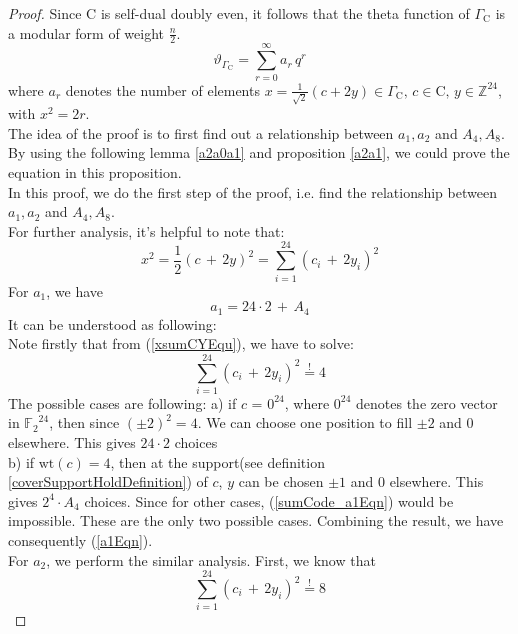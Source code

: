 \documentclass[12pt]{article}
\theoremstyle{definition}
\numberwithin{equation}{theorem}
\numberwithin{figure}{theorem}
\newcommand{\Ftwo}{\ensuremath{\mathbb{F}_2}}
\newcommand{\simpleCodes}{\ensuremath{\mathrm{C}}}
\newcommand{\buildLattice}[1]{\ensuremath{\Gamma_{#1}}}
\newcommand{\thetaFunction}[1]{\ensuremath{\vartheta_{#1}}}
\newcommand{\wt}[1]{\ensuremath{\text{wt}(#1)}}
\newcommand{\Integer}{\ensuremath{\mathbb{Z}}}
\begin{document}
\begin{proof}
Since {\simpleCodes} is self-dual doubly even, it follows that the theta function of $\buildLattice{\simpleCodes}$ is a modular form of weight $\frac{n}{2}$.\\
\[
	\thetaFunction{\buildLattice{\simpleCodes}} = \sum_{r = 0}^{\infty} a_r \, q^r
\]
where $a_r$ denotes the number of elements $x = \frac{1}{\sqrt{2}}(c + 2y) \in \buildLattice{\simpleCodes},\, c \in \simpleCodes, \, y\in \Integer^{24}$, with $x^2 = 2r$. \\
The idea of the proof is to first find out a relationship between $a_1, a_2$ and $A_4, A_8$. By using the following lemma \ref{a2a0a1} and proposition \ref{a2a1}, we could prove the equation in this proposition.\\
In this proof, we do the first step of the proof, i.e. find the relationship between $a_1, a_2$ and $A_4, A_8$.\\
For further analysis, it's helpful to note that:
\begin{equation}\label{xsumCYEqu}
	x^2 = \frac{1}{2}(c \,+\,2y)^2 = \sum_{i = 1}^{24}(c_i \, + \, 2y_i)^2
\end{equation}
For $a_1$, we have
\begin{equation}\label{a1Eqn}
	a_1 = 24 \cdot 2 \,+ \,A_4
\end{equation}
It can be understood as following:\\
Note firstly that from (\ref{xsumCYEqu}), we have to solve:
\begin{equation}\label{sumCode_a1Eqn}
	\sum_{i = 1}^{24}(c_i \, + \, 2y_i)^2 \overset{!}{=} 4
\end{equation}
The possible cases are following:
a) if $c$ = $0^{24}$, where $0^{24}$ denotes the zero vector in $\Ftwo^{24}$, then since $(\pm2)^2 = 4$. We can choose one position to fill $\pm2$ and 0 elsewhere. This gives $24 \cdot 2$ choices\\
b) if $\wt{c} = 4$, then at the support(see definition \ref{coverSupportHoldDefinition}) of $c$, $y$ can be chosen $\pm1$ and 0 elsewhere. This gives $2^4 \cdot A_4$ choices.
Since for other cases, (\ref{sumCode_a1Eqn}) would be impossible. These are the only two possible cases. Combining the result, we have consequently (\ref{a1Eqn}).\\
For $a_2$, we perform the similar analysis. First, we know that
\begin{equation}\label{sumCY_a2Eqn}
	\sum_{i = 1}^{24}(c_i \, + \, 2y_i)^2 \overset{!}{=} 8
\end{equation}

\end{proof}
\end{document}
